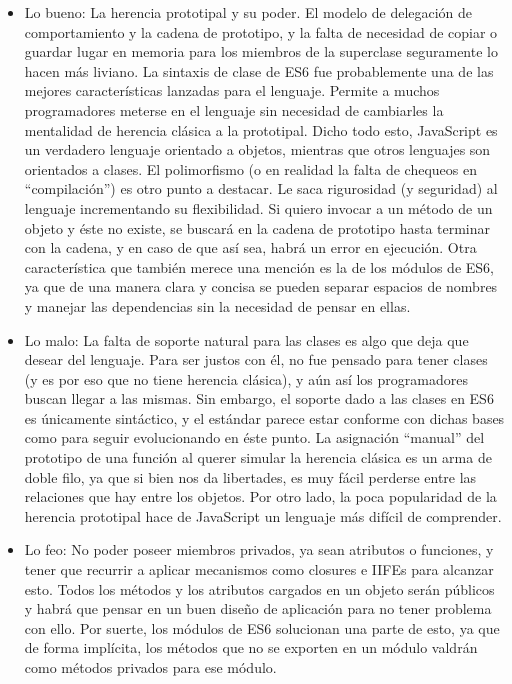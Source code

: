 \begin{itemize}
\item Lo bueno: 
La herencia prototipal y su poder. El modelo de delegación de comportamiento y la cadena de prototipo, y la falta de necesidad de copiar o guardar lugar en memoria para los miembros de la superclase seguramente lo hacen más liviano. 
La sintaxis de clase de ES6 fue probablemente una de las mejores características lanzadas para el lenguaje. Permite a muchos programadores meterse en el lenguaje sin necesidad de cambiarles la mentalidad de herencia clásica a la prototipal.
Dicho todo esto, JavaScript es un verdadero lenguaje orientado a objetos, mientras que otros lenguajes son orientados a clases.
El polimorfismo (o en realidad la falta de chequeos en "`compilación"') es otro punto a destacar. Le saca rigurosidad (y seguridad) al lenguaje incrementando su flexibilidad. Si quiero invocar a un método de un objeto y éste no existe, se buscará en la cadena de prototipo hasta terminar con la cadena, y en caso de que así sea, habrá un error en ejecución.
Otra característica que también merece una mención es la de los módulos de ES6, ya que de una manera clara y concisa se pueden separar espacios de nombres y manejar las dependencias sin la necesidad de pensar en ellas.
\item Lo malo: 
La falta de soporte natural para las clases es algo que deja que desear del lenguaje. Para ser justos con él, no fue pensado para tener clases (y es por eso que no tiene herencia clásica), y aún así los programadores buscan llegar a las mismas. Sin embargo, el soporte dado a las clases en ES6 es únicamente sintáctico, y el estándar parece estar conforme con dichas bases como para seguir evolucionando en éste punto. 
La asignación "`manual"' del prototipo de una función al querer simular la herencia clásica es un arma de doble filo, ya que si bien nos da libertades, es muy fácil perderse entre las relaciones que hay entre los objetos. Por otro lado, la poca popularidad de la herencia prototipal hace de JavaScript un lenguaje más difícil de comprender.
\item Lo feo: 
No poder poseer miembros privados, ya sean atributos o funciones, y tener que recurrir a aplicar mecanismos como closures e IIFEs para alcanzar esto. Todos los métodos y los atributos cargados en un objeto serán públicos y habrá que pensar en un buen diseño de aplicación para no tener problema con ello. Por suerte, los módulos de ES6 solucionan una parte de esto, ya que de forma implícita, los métodos que no se exporten en un módulo valdrán como métodos privados para ese módulo.
\end{itemize}